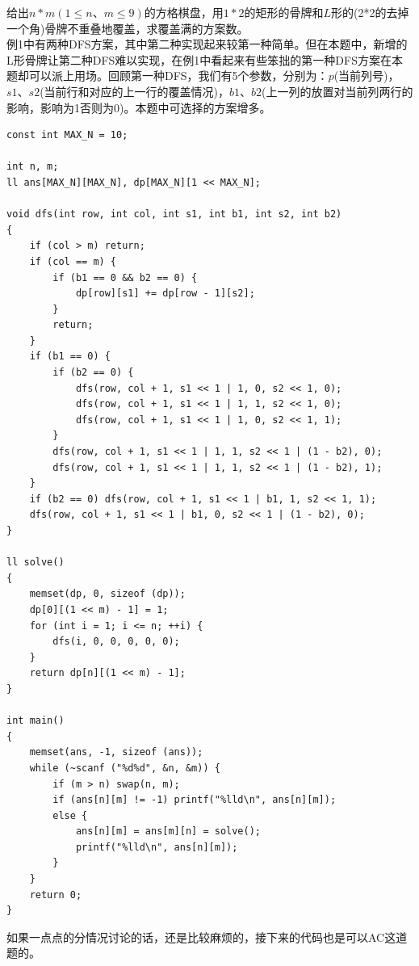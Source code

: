 给出$n*m(1\leq n、m\leq 9)$的方格棋盘，用$1*2$的矩形的骨牌和$L$形的(2*2的去掉一个角)骨牌不重叠地覆盖，求覆盖满的方案数。 \\

例1中有两种DFS方案，其中第二种实现起来较第一种简单。但在本题中，新增的L形骨牌让第二种DFS难以实现，在例1中看起来有些笨拙的第一种DFS方案在本题却可以派上用场。回顾第一种DFS，我们有5个参数，分别为：$p$(当前列号)，$s1、s2$(当前行和对应的上一行的覆盖情况)，$b1、b2$(上一列的放置对当前列两行的影响，影响为1否则为0)。本题中可选择的方案增多。

\begin{lstlisting}
const int MAX_N = 10;

int n, m;
ll ans[MAX_N][MAX_N], dp[MAX_N][1 << MAX_N];

void dfs(int row, int col, int s1, int b1, int s2, int b2)
{
	if (col > m) return;
	if (col == m) {
		if (b1 == 0 && b2 == 0) {
			dp[row][s1] += dp[row - 1][s2];
		}
		return;
	}
	if (b1 == 0) {
		if (b2 == 0) {
			dfs(row, col + 1, s1 << 1 | 1, 0, s2 << 1, 0);
			dfs(row, col + 1, s1 << 1 | 1, 1, s2 << 1, 0);
			dfs(row, col + 1, s1 << 1 | 1, 0, s2 << 1, 1);
		}
		dfs(row, col + 1, s1 << 1 | 1, 1, s2 << 1 | (1 - b2), 0);
		dfs(row, col + 1, s1 << 1 | 1, 1, s2 << 1 | (1 - b2), 1);
	}
	if (b2 == 0) dfs(row, col + 1, s1 << 1 | b1, 1, s2 << 1, 1);
	dfs(row, col + 1, s1 << 1 | b1, 0, s2 << 1 | (1 - b2), 0);
}

ll solve()
{
	memset(dp, 0, sizeof (dp));
	dp[0][(1 << m) - 1] = 1;
	for (int i = 1; i <= n; ++i) {
		dfs(i, 0, 0, 0, 0, 0);
	}
	return dp[n][(1 << m) - 1];
}

int main()
{
	memset(ans, -1, sizeof (ans));
	while (~scanf ("%d%d", &n, &m)) {
		if (m > n) swap(n, m);
		if (ans[n][m] != -1) printf("%lld\n", ans[n][m]);
		else {
			ans[n][m] = ans[m][n] = solve();
			printf("%lld\n", ans[n][m]);
		}
	}
	return 0;
}
\end{lstlisting}
如果一点点的分情况讨论的话，还是比较麻烦的，接下来的代码也是可以AC这道题的。 \\
